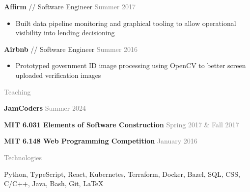 \documentclass[11pt]{article}
\newcommand{\rsection}[1]{\vspace{1.5em}\textcolor{gray}{\Large \robotoslab #1}\vspace{0.5em}}
\newcommand{\bt}[1]{\textbf{#1}} %
\newcommand{\gap}[0]{\vspace{0.3em}} %
\newcommand{\sep}[0]{ // } %
\newcommand{\gray}[1]{\textcolor{gray}{#1}}
\newcommand{\e}[0]{> }
\begin{document}
\bt{Affirm}\sep Software Engineer \hfill \gray{Summer 2017}

\begin{itemize}
\item[\e] Built data pipeline monitoring and graphical tooling to allow operational visibility into lending decisioning
\end{itemize}

\gap

\bt{Airbnb}\sep Software Engineer \hfill \gray{Summer 2016}

\begin{itemize}
\item[\e] Prototyped government ID image processing using OpenCV to better screen uploaded verification images
\end{itemize}

\rsection{Teaching}

\bt{JamCoders} \hfill \gray{Summer 2024}

\gap

\bt{MIT 6.031 Elements of Software Construction} \hfill \gray{Spring 2017 \& Fall 2017}

\gap

\bt{MIT 6.148 Web Programming Competition} \hfill \gray{January 2016}


\rsection{Technologies}

Python, TypeScript, React, Kubernetes, Terraform, Docker, Bazel, SQL, CSS, C/C++, Java, Bash, Git, {\selectfont\LaTeX}
\end{document}
